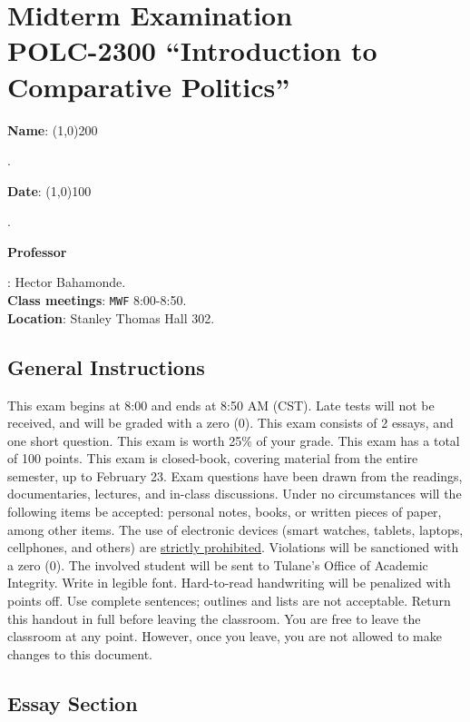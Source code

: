 \documentclass{article}
\begin{document}
{\centering\section*{Midterm Examination\\POLC-2300 ``Introduction to Comparative Politics''}}

{\vspace{.5cm}\raggedright{\bf Name}: \line(1,0){200}}. %
{\vspace{.5cm}\hspace{4.5cm}\raggedright{\bf Date}: \line(1,0){100}}. %


{\vspace{.5cm}\raggedright \bf Professor}: Hector Bahamonde.\\
{\bf Class meetings}: \texttt{MWF} 8:00-8:50.\\
{\bf Location}: Stanley Thomas Hall 302.


\vspace{0.5cm}\subsection*{General Instructions}

This exam begins at 8:00 and ends at 8:50 AM (CST). Late tests will not be received, and will be graded with a zero (0). This exam consists of 2 essays, and one short question. This exam is worth 25\% of your grade. This exam has a total of 100 points. This exam is closed-book, covering material from the entire semester, up to February 23. Exam questions have been drawn from the readings, documentaries, lectures, and in-class discussions. Under no circumstances will the following items be accepted: personal notes, books, or written pieces of paper, among other items. The use of electronic devices (smart watches, tablets, laptops, cellphones, and others) are \underline{strictly prohibited}. Violations will be sanctioned with a zero (0). The involved student will be sent to Tulane's Office of Academic Integrity. Write in legible font.  Hard-to-read handwriting will be penalized with points off. Use complete sentences; outlines and lists are not acceptable. Return this handout in full before leaving the classroom. You are free to leave the classroom at any point. However, once you leave, you are not allowed to make changes to this document.


\subsection*{Essay Section}
\end{document}
